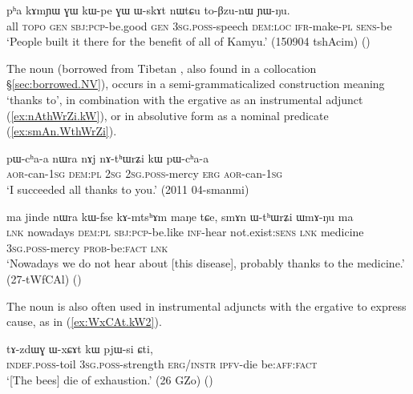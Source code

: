 \begin{exe}
\ex \label{ex:kWpe.GW.WskAt}
\gll pʰa kɤmɲɯ ɣɯ kɯ-pe ɣɯ ɯ-skɤt nɯtɕu to-βzu-nɯ ɲɯ-ŋu. \\
all  \textsc{topo} \textsc{gen} \textsc{sbj}:\textsc{pcp}-be.good \textsc{gen} \textsc{3sg}.\textsc{poss}-speech \textsc{dem}:\textsc{loc} \textsc{ifr}-make-\textsc{pl} \textsc{sens}-be \\
\glt `People built it there for the benefit of all of Kamyu.' (150904 tshAcim)
()
\end{exe}

The noun  (borrowed from Tibetan , also found in a collocation §\ref{sec:borrowed.NV}), occurs in a semi-grammaticalized construction meaning `thanks to', in combination with the ergative  as an instrumental adjunct (\ref{ex:nAthWrZi.kW}), or in absolutive form as a nominal predicate (\ref{ex:smAn.WthWrZi}).

  \begin{exe}
\ex \label{ex:nAthWrZi.kW}
\gll pɯ-cʰa-a nɯra nɤj nɤ-tʰɯrʑi kɯ pɯ-cʰa-a \\
\textsc{aor}-can-\textsc{1sg} \textsc{dem}:\textsc{pl} \textsc{2sg} \textsc{2sg}.\textsc{poss}-mercy \textsc{erg} \textsc{aor}-can-\textsc{1sg} \\
\glt `I succeeded all thanks to you.' (2011 04-smanmi)
  \end{exe}

  \begin{exe}
\ex \label{ex:smAn.WthWrZi}
\gll   ma jinde nɯra kɯ-fse kɤ-mtsʰɤm maŋe tɕe, smɤn ɯ-tʰɯrʑi ɯmɤ-ŋu ma \\
\textsc{lnk} nowadays \textsc{dem}:\textsc{pl} \textsc{sbj}:\textsc{pcp}-be.like \textsc{inf}-hear not.exist:\textsc{sens} \textsc{lnk} medicine   \textsc{3sg}.\textsc{poss}-mercy \textsc{prob}-be:\textsc{fact} \textsc{lnk} \\
\glt `Nowadays we do not hear about [this disease], probably thanks to the medicine.' (27-tWfCAl)
()
  \end{exe}  

The noun  is also often used in instrumental adjuncts with the ergative to express cause, as in (\ref{ex:WxCAt.kW2}).

  \begin{exe}
\ex \label{ex:WxCAt.kW2}
\gll   tɤ-zdɯɣ ɯ-xɕɤt kɯ pjɯ-si ɕti, \\
  \textsc{indef}.\textsc{poss}-toil  \textsc{3sg}.\textsc{poss}-strength \textsc{erg/instr} \textsc{ipfv}-die be:\textsc{aff}:\textsc{fact} \\
 \glt `[The bees] die of exhaustion.' (26 GZo) ()
  \end{exe}
